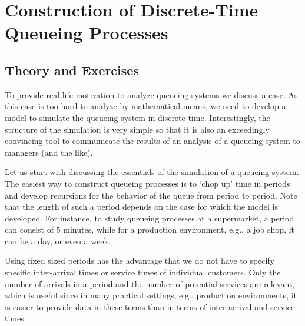 \section{Construction of Discrete-Time Queueing
  Processes}
\label{sec:constr-discr-time}

\subsection*{Theory and Exercises}



To provide real-life motivation to analyze queueing systems we discuss a case.  As this case is too hard to analyze by mathematical means,  we need to develop a model to simulate the queueing system in discrete time.  Interestingly, the structure of the simulation is very simple so that  it is also  an exceedingly convincing tool to communicate the results of an analysis of a queueing system to managers (and the like).  

Let us start with discussing the essentials of the simulation of a queueing system. The easiest way  to construct queueing processes is to `chop up' time in periods and develop recursions for the behavior of the queue from period to period. Note that the length of such a period depends on the
case for which the model is developed.  For instance, to study queueing processes at a supermarket, a period can consist of $5$ minutes, while for a production environment, e.g., a job shop, it can
be a day, or even a week.

Using fixed sized periods has the advantage that we do not have to
specify specific inter-arrival times or service times of individual
customers. Only the number of arrivals in a period and the number of
potential services are relevant, which is useful since in many
practical settings, e.g., production environments, it is easier to
provide data in these terms than in terms of inter-arrival and service
times. 

